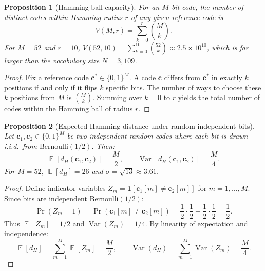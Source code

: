\documentclass[11pt,a4paper]{article}
\newtheorem{proposition}{Proposition}
\DeclareMathOperator{\E}{\mathbb{E}}
\DeclareMathOperator{\Var}{Var}
\begin{document}
\begin{proposition}[Hamming ball capacity]\label{prop:hamming-ball}
For an $M$-bit code, the number of distinct codes within Hamming radius $r$ of any given reference code is
\begin{equation}
    V(M, r) = \sum_{k=0}^{r} \binom{M}{k}.
\end{equation}
For $M=52$ and $r=10$, $V(52,10) = \sum_{k=0}^{10} \binom{52}{k} \approx 2.5 \times 10^{10}$, which is far larger than the vocabulary size $N=3{,}109$.
\end{proposition}

\begin{proof}
Fix a reference code $\mathbf{c}^* \in \{0,1\}^M$. A code $\mathbf{c}$ differs from $\mathbf{c}^*$ in exactly $k$ positions if and only if it flips $k$ specific bits. The number of ways to choose these $k$ positions from $M$ is $\binom{M}{k}$. Summing over $k=0$ to $r$ yields the total number of codes within the Hamming ball of radius $r$.
\end{proof}

\begin{proposition}[Expected Hamming distance under random independent bits]\label{prop:random-hamming}
Let $\mathbf{c}_1, \mathbf{c}_2 \in \{0,1\}^M$ be two independent random codes where each bit is drawn i.i.d.\ from $\text{Bernoulli}(1/2)$. Then:
\begin{equation}
    \E[d_H(\mathbf{c}_1, \mathbf{c}_2)] = \frac{M}{2}, \qquad \Var[d_H(\mathbf{c}_1, \mathbf{c}_2)] = \frac{M}{4}.
\end{equation}
For $M=52$, $\E[d_H] = 26$ and $\sigma = \sqrt{13} \approx 3.61$.
\end{proposition}

\begin{proof}
Define indicator variables $Z_m = \mathbf{1}[\mathbf{c}_1[m] \neq \mathbf{c}_2[m]]$ for $m=1,\dots,M$. Since bits are independent Bernoulli$(1/2)$:
\begin{equation}
    \Pr(Z_m = 1) = \Pr(\mathbf{c}_1[m] \neq \mathbf{c}_2[m]) = \frac{1}{2}\cdot\frac{1}{2} + \frac{1}{2}\cdot\frac{1}{2} = \frac{1}{2}.
\end{equation}
Thus $\E[Z_m] = 1/2$ and $\Var(Z_m) = 1/4$. By linearity of expectation and independence:
\begin{equation}
    \E[d_H] = \sum_{m=1}^{M} \E[Z_m] = \frac{M}{2}, \qquad
    \Var(d_H) = \sum_{m=1}^{M} \Var(Z_m) = \frac{M}{4}.
\end{equation}
\end{proof}
\end{document}
